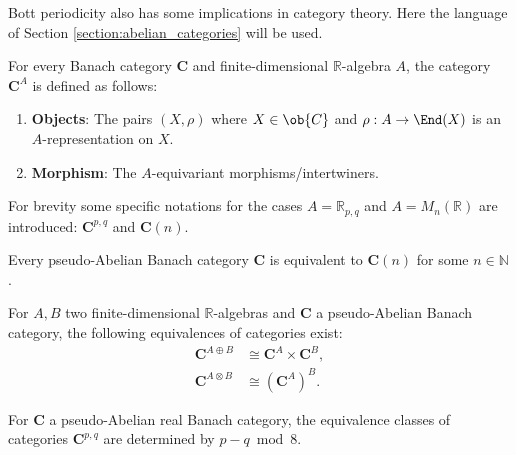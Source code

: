     Bott periodicity also has some implications in category theory. Here the language of Section \ref{section:abelian_categories} will be used.

    For every Banach category $\mathbf{C}$ and finite-dimensional $\mathbb{R}$-algebra $A$, the category $\mathbf{C}^A$ is defined as follows:
    \begin{enumerate}
        \item\textbf{Objects}: The pairs $(X,\rho)$ where $X\in\ob{C}$ and $\rho:A\rightarrow\End(X)$ is an $A$-representation on $X$.
        \item\textbf{Morphism}: The $A$-equivariant morphisms/intertwiners.
    \end{enumerate}
    \begin{notation}
        For brevity some specific notations for the cases $A=\mathbb{R}_{p,q}$ and $A=M_n(\mathbb{R})$ are introduced: $\mathbf{C}^{p,q}$ and $\mathbf{C}(n)$.
    \end{notation}

    \begin{property}
        Every pseudo-Abelian Banach category $\mathbf{C}$ is equivalent to $\mathbf{C}(n)$ for some $n\in\mathbb{N}$.
    \end{property}

    \begin{property}
        For $A,B$ two finite-dimensional $\mathbb{R}$-algebras and $\mathbf{C}$ a pseudo-Abelian Banach category, the following equivalences of categories exist:
        \begin{align}
            \mathbf{C}^{A\oplus B}&\cong\mathbf{C}^A\times\mathbf{C}^B,\\
            \mathbf{C}^{A\otimes B}&\cong\left(\mathbf{C}^A\right)^B.
        \end{align}
    \end{property}
    \begin{property}\label{clifford:bott_periodicity_category}
        For $\mathbf{C}$ a pseudo-Abelian real Banach category, the equivalence classes of categories $\mathbf{C}^{p,q}$ are determined by $p-q\bmod8$.
    \end{property}

